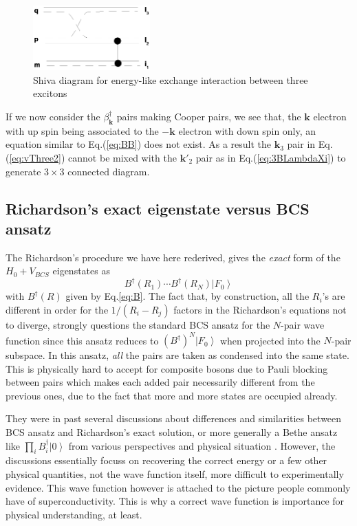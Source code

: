 \documentclass[aps,prb,superscriptaddress,showpacs,reprint,lengthcheck]{revtex4}
\newcommand{\vk}{\ensuremath{\mathbf{k}}}
\begin{document}
 
\begin{figure}[htb]
   \includegraphics[width=0.4\textwidth]{threeExciton.eps}
\caption{Shiva diagram for energy-like exchange interaction between three excitons\label{fig:threeExciton} }
 \end{figure}


If we now consider the $\beta^\dagger_\vk$ pairs making Cooper pairs, we see that, the $\vk$ electron with up spin being associated to the $-\vk$ electron with down spin only, an equation similar to Eq.(\ref{eq:BB}) does not exist.  As a result the $\vk_3$ pair in Eq.(\ref{eq:vThree2}) cannot be mixed with the $\vk'_2$ pair as in Eq.(\ref{eq:3BLambdaXi}) to generate $3\times3$ connected diagram. 


\subsection{Richardson's exact eigenstate versus BCS ansatz}

The Richardson's procedure we have here rederived, gives the 
\emph{exact} form of the $H_0+V_{BCS}$ eigenstates as 
\begin{equation}
B^{\dagger}(R_1)\cdots{}B^{\dagger}(R_N)\left|F_0\right>  
\end{equation}
with $B^{\dagger}(R)$ given by Eq.\eqref{eq:B}. The fact that, by
construction, all the $R_i$'s are different in order for the $1/(R_i-R_j)$ factors in the Richardson's equations not to diverge, strongly questions the standard
BCS ansatz for the $N$-pair wave function since this ansatz reduces to $\left(B^{\dagger}\right)
^N\left|F_0\right> $ when projected into the $N$-pair subspace. In this ansatz,  \emph{all} the pairs are taken as condensed into the same state. This is physically hard to accept for composite bosons due to Pauli blocking between pairs which makes each added pair necessarily different from the previous ones, due to the fact that more and more states are occupied already. 

They were in past several discussions about differences and similarities between BCS ansatz and Richardson's exact solution, or more generally a Bethe ansatz like $\prod_iB^\dagger_i\left|0\right>$ from various perspectives and physical situation \cite{bang,hasegawa}.  However, the discussions essentially focuss on recovering the correct energy or a few other physical quantities, not the wave function itself, more difficult to experimentally evidence. This wave function however is attached to the picture people commonly have of superconductivity. This is why a correct wave function is importance for physical understanding, at least.
\end{document}
